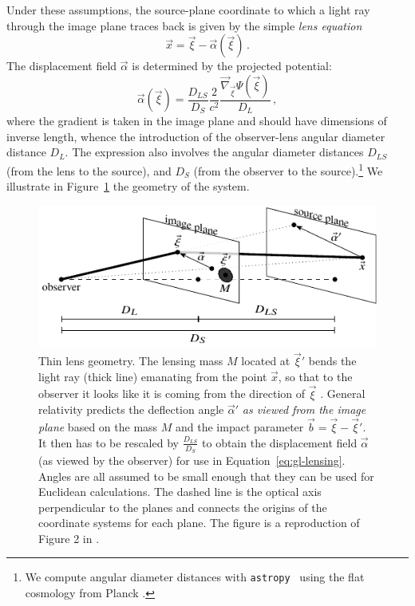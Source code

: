 Under these assumptions, the source-plane coordinate to which a light ray through the image plane traces back is given by the simple \emph{lens equation}
\begin{equation} \label{eq:gl-lensing}
    \vec{x} = \vec{\xi} - \vec{\alpha}(\vec{\xi}) \, .
\end{equation}
The displacement field $\vec\alpha$ is determined by the projected potential:
\begin{equation} \label{eq:disp_grad}
    \vec{\alpha}(\vec{\xi}) = \frac{D_{LS}}{D_S} \frac{2}{c^2} \frac{\vec{\nabla}_{\vec{\xi}} \Psi(\vec\xi)}{D_L} \, ,
\end{equation}
where the gradient is taken in the image plane and should have dimensions of inverse length, whence the introduction of the observer-lens angular diameter distance $D_L$. The expression also involves the angular diameter distances $D_{LS}$ (from the lens to the source), and $D_S$ (from the observer to the source).\footnote{
    We compute angular diameter distances with \texttt{astropy}~\citep{Astropy:2013muo,Astropy:2018wqo} using the flat cosmology from Planck \citep{Planck:2018vyg}.
} 
We illustrate in Figure~\ref{fig:gl-lensing} the geometry of the system.

\begin{figure}
    \centering
    \includegraphics[width=0.8\linewidth]{Figures/GL-lensing.pdf}
    \caption{Thin lens geometry. The lensing mass $M$ located at $\vec\xi'$ bends the light ray (thick line) emanating from the point $\vec x$, so that to the observer it looks like it is coming from the direction of $\vec\xi$ . General relativity predicts the deflection angle $\vec\alpha'$  \emph{as viewed from the image plane} based on the mass $M$ and the impact parameter $\vec b = \vec \xi - \vec \xi '$. It then has to be rescaled by $\frac{D_{LS}}{D_S}$ to obtain the displacement field $\vec\alpha$ (as viewed by the observer) for use in Equation~\eqref{eq:gl-lensing}. Angles are all assumed to be small enough that they can be used for Euclidean calculations. The dashed line is the optical axis perpendicular to the planes and connects the origins of the coordinate systems for each plane. The figure is a reproduction of Figure 2 in \cite{Karchev:2021fro}.}
    \label{fig:gl-lensing}
\end{figure}

